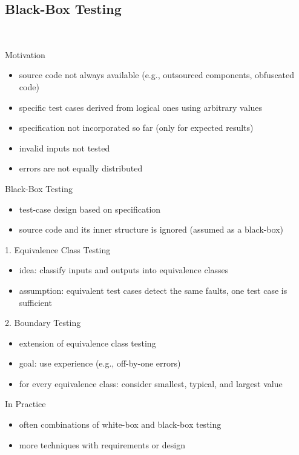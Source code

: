 \subsection{Black-Box Testing}
\begin{frame}{\insertsubsection\ \mytitlesource{\ludewiglichter}}
	\begin{fancycolumns}
		\begin{note}{Motivation}
			\begin{itemize}
				\item source code not always available (e.g., outsourced components, obfuscated code)
				\item specific test cases derived from logical ones using arbitrary values
				\item specification not incorporated so far (only for expected results)
				\item invalid inputs not tested
				\item errors are not equally distributed
			\end{itemize}
		\end{note}
		\begin{definition}{Black-Box Testing }
			\begin{itemize}
				\item test-case design based on specification
				\item source code and its inner structure is ignored (assumed as a black-box)
			\end{itemize}
		\end{definition}
		\nextcolumn
		\vspace{-5mm}
		\begin{definition}{1. Equivalence Class Testing}
			\begin{itemize}
				\item idea: classify inputs and outputs into equivalence classes
				\item assumption: equivalent test cases detect the same faults, one test case is sufficient
			\end{itemize}
		\end{definition}
		\begin{definition}{2. Boundary Testing}
			\begin{itemize}
				\item extension of equivalence class testing
				\item goal: use experience (e.g., off-by-one errors)
				\item for every equivalence class: consider smallest, typical, and largest value
			\end{itemize}
		\end{definition}
		\begin{example}{In Practice}
			\begin{itemize}
				\item often combinations of white-box and black-box testing
				\item more techniques with requirements or design
			\end{itemize}
		\end{example}
	\end{fancycolumns}
\end{frame}

